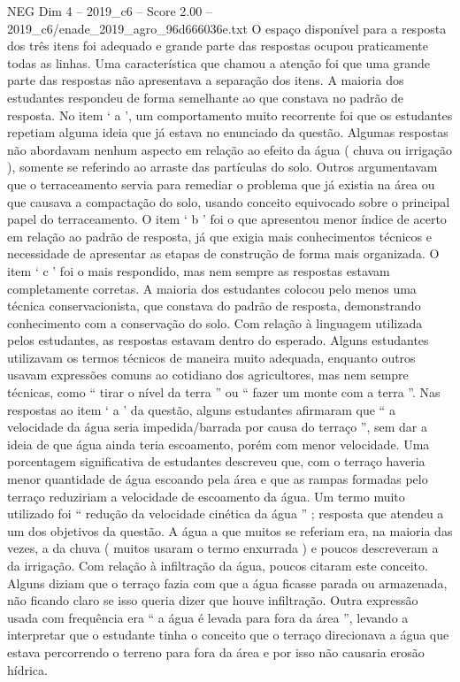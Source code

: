 \begin{textsample}{NEG Dim 4 – 2019\_c6 – Score 2.00 – 2019\_c6/enade\_2019\_agro\_96d666036e.txt}
O espaço disponível para a resposta dos três itens foi adequado e grande parte das respostas ocupou praticamente todas as linhas.
Uma característica que chamou a atenção foi que uma grande parte das respostas não apresentava a separação dos itens.
A maioria dos estudantes respondeu de forma semelhante ao que constava no padrão de resposta.
No item ‘ a ’, um comportamento muito recorrente foi que os estudantes repetiam alguma ideia que já estava no enunciado da questão.
Algumas respostas não abordavam nenhum aspecto em relação ao efeito da água ( chuva ou irrigação ), somente se referindo ao arraste das partículas do solo.
Outros argumentavam que o terraceamento servia para remediar o problema que já existia na área ou que causava a compactação do solo, usando conceito equivocado sobre o principal papel do terraceamento.
O item ‘ b ’ foi o que apresentou menor índice de acerto em relação ao padrão de resposta, já que exigia mais conhecimentos técnicos e necessidade de apresentar as etapas de construção de forma mais organizada.
O item ‘ c ’ foi o mais respondido, mas nem sempre as respostas estavam completamente corretas.
A maioria dos estudantes colocou pelo menos uma técnica conservacionista, que constava do padrão de resposta, demonstrando conhecimento com a conservação do solo.
Com relação à linguagem utilizada pelos estudantes, as respostas estavam dentro do esperado.
Alguns estudantes utilizavam os termos técnicos de maneira muito adequada, enquanto outros usavam expressões comuns ao cotidiano dos agricultores, mas nem sempre técnicas, como “ tirar o nível da terra ” ou “ fazer um monte com a terra ”.
Nas respostas ao item ‘ a ’ da questão, alguns estudantes afirmaram que “ a velocidade da água seria impedida/barrada por causa do terraço ”, sem dar a ideia de que água ainda teria escoamento, porém com menor velocidade.
Uma porcentagem significativa de estudantes descreveu que, com o terraço haveria menor quantidade de água escoando pela área e que as rampas formadas pelo terraço reduziriam a velocidade de escoamento da água.
Um termo muito utilizado foi “ redução da velocidade cinética da água ” ; resposta que atendeu a um dos objetivos da questão.
A água a que muitos se referiam era, na maioria das vezes, a da chuva ( muitos usaram o termo enxurrada ) e poucos descreveram a da irrigação.
Com relação à infiltração da água, poucos citaram este conceito.
Alguns diziam que o terraço fazia com que a água ficasse parada ou armazenada, não ficando claro se isso queria dizer que houve infiltração.
Outra expressão usada com frequência era “ a água é levada para fora da área ”, levando a interpretar que o estudante tinha o conceito que o terraço direcionava a água que estava percorrendo o terreno para fora da área e por isso não causaria erosão hídrica.

\end{textsample}
